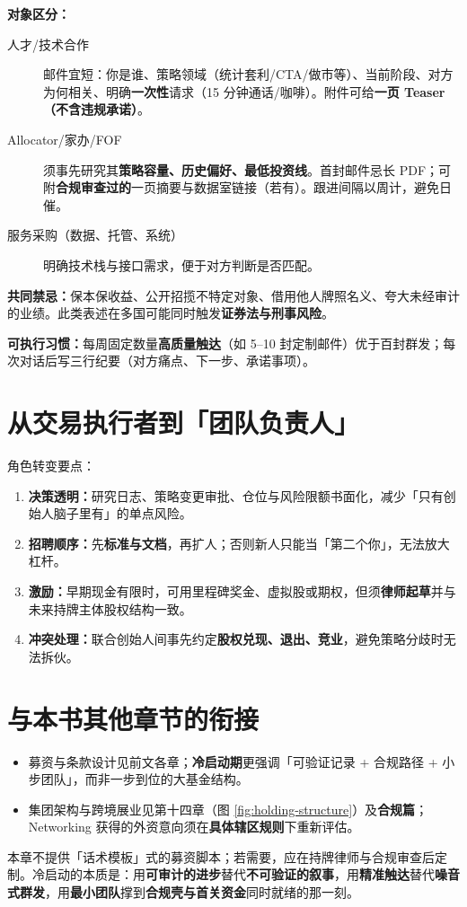 \textbf{对象区分：}
\begin{description}
  \item[人才/技术合作] 邮件宜短：你是谁、策略领域（统计套利/CTA/做市等）、当前阶段、对方为何相关、明确\textbf{一次性}请求（15 分钟通话/咖啡）。附件可给\textbf{一页 Teaser（不含违规承诺）}。
  \item[Allocator/家办/FOF] 须事先研究其\textbf{策略容量、历史偏好、最低投资线}。首封邮件忌长 PDF；可附\textbf{合规审查过的}一页摘要与数据室链接（若有）。跟进间隔以周计，避免日催。
  \item[服务采购（数据、托管、系统）] 明确技术栈与接口需求，便于对方判断是否匹配。
\end{description}

\textbf{共同禁忌：}保本保收益、公开招揽不特定对象、借用他人牌照名义、夸大未经审计的业绩。此类表述在多国可能同时触发\textbf{证券法与刑事风险}。

\textbf{可执行习惯：}每周固定数量\textbf{高质量触达}（如 5--10 封定制邮件）优于百封群发；每次对话后写三行纪要（对方痛点、下一步、承诺事项）。

\section{从交易执行者到「团队负责人」}

角色转变要点：
\begin{enumerate}
  \item \textbf{决策透明：}研究日志、策略变更审批、仓位与风险限额书面化，减少「只有创始人脑子里有」的单点风险。
  \item \textbf{招聘顺序：}先\textbf{标准与文档}，再扩人；否则新人只能当「第二个你」，无法放大杠杆。
  \item \textbf{激励：}早期现金有限时，可用里程碑奖金、虚拟股或期权，但须\textbf{律师起草}并与未来持牌主体股权结构一致。
  \item \textbf{冲突处理：}联合创始人间事先约定\textbf{股权兑现、退出、竞业}，避免策略分歧时无法拆伙。
\end{enumerate}

\section{与本书其他章节的衔接}

\begin{itemize}
  \item 募资与条款设计见前文各章；\textbf{冷启动期}更强调「可验证记录 + 合规路径 + 小步团队」，而非一步到位的大基金结构。
  \item 集团架构与跨境展业见第十四章（图 \ref{fig:holding-structure}）及\textbf{合规篇}；Networking 获得的外资意向须在\textbf{具体辖区规则}下重新评估。
\end{itemize}

本章不提供「话术模板」式的募资脚本；若需要，应在持牌律师与合规审查后定制。冷启动的本质是：用\textbf{可审计的进步}替代\textbf{不可验证的叙事}，用\textbf{精准触达}替代\textbf{噪音式群发}，用\textbf{最小团队}撑到\textbf{合规壳与首关资金}同时就绪的那一刻。
